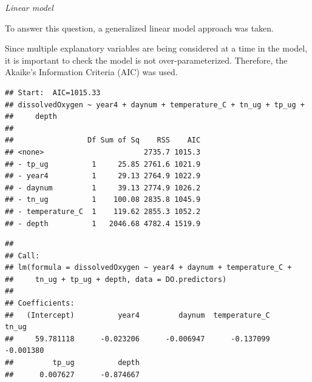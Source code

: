 \documentclass[12pt,]{article}
\newenvironment{Shaded}{\begin{snugshade}}{\end{snugshade}}
\newcommand{\CommentTok}[1]{\textcolor[rgb]{0.56,0.35,0.01}{\textit{#1}}}
\newcommand{\DataTypeTok}[1]{\textcolor[rgb]{0.13,0.29,0.53}{#1}}
\newcommand{\KeywordTok}[1]{\textcolor[rgb]{0.13,0.29,0.53}{\textbf{#1}}}
\newcommand{\NormalTok}[1]{#1}
\newcommand{\OperatorTok}[1]{\textcolor[rgb]{0.81,0.36,0.00}{\textbf{#1}}}
\newcommand{\StringTok}[1]{\textcolor[rgb]{0.31,0.60,0.02}{#1}}
\begin{document}
\emph{Linear model}

To answer this question, a generalized linear model approach was taken.

Since multiple explanatory variables are being considered at a time in
the model, it is important to check the model is not over-parameterized.
Therefore, the Akaike's Information Criteria (AIC) was used.

\begin{Shaded}
\end{Shaded}

\begin{verbatim}
## Start:  AIC=1015.33
## dissolvedOxygen ~ year4 + daynum + temperature_C + tn_ug + tp_ug + 
##     depth
## 
##                 Df Sum of Sq    RSS    AIC
## <none>                       2735.7 1015.3
## - tp_ug          1     25.85 2761.6 1021.9
## - year4          1     29.13 2764.9 1022.9
## - daynum         1     39.13 2774.9 1026.2
## - tn_ug          1    100.08 2835.8 1045.9
## - temperature_C  1    119.62 2855.3 1052.2
## - depth          1   2046.68 4782.4 1519.9
\end{verbatim}

\begin{verbatim}
## 
## Call:
## lm(formula = dissolvedOxygen ~ year4 + daynum + temperature_C + 
##     tn_ug + tp_ug + depth, data = DO.predictors)
## 
## Coefficients:
##   (Intercept)          year4         daynum  temperature_C          tn_ug  
##     59.781118      -0.023206      -0.006947      -0.137099      -0.001380  
##         tp_ug          depth  
##      0.007627      -0.874667
\end{verbatim}
\end{document}
